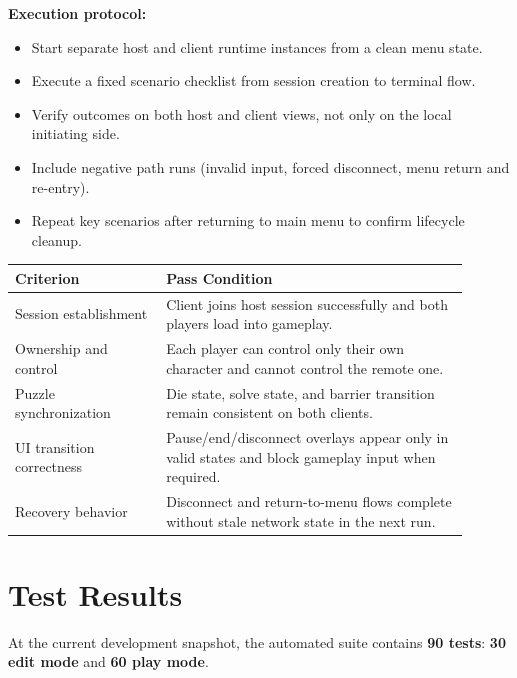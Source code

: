 \textbf{Execution protocol:}
\begin{itemize}
\item Start separate host and client runtime instances from a clean menu state.
\item Execute a fixed scenario checklist from session creation to terminal flow.
\item Verify outcomes on both host and client views, not only on the local initiating side.
\item Include negative path runs (invalid input, forced disconnect, menu return and re-entry).
\item Repeat key scenarios after returning to main menu to confirm lifecycle cleanup.
\end{itemize}

\begin{table}[H]
\centering
\caption{Manual Test Execution Criteria}
\label{tab:manual-test-criteria}
\begin{longtable}{|>{\centering\arraybackslash}m{0.3\linewidth}|>{\centering\arraybackslash}m{0.6\linewidth}|}
\hline
\hline
\textbf{Criterion} & \textbf{Pass Condition} \\
\hline
Session establishment & Client joins host session successfully and both players load into gameplay. \\
\hline
Ownership and control & Each player can control only their own character and cannot control the remote one. \\
\hline
Puzzle synchronization & Die state, solve state, and barrier transition remain consistent on both clients. \\
\hline
UI transition correctness & Pause/end/disconnect overlays appear only in valid states and block gameplay input when required. \\
\hline
Recovery behavior & Disconnect and return-to-menu flows complete without stale network state in the next run. \\
\hline
\end{longtable}
\addtocounter{table}{-1}
\end{table}

\newpage

\section{Test Results}
At the current development snapshot, the automated suite contains \textbf{90 tests}: \textbf{30 edit mode} and \textbf{60 play mode}.

